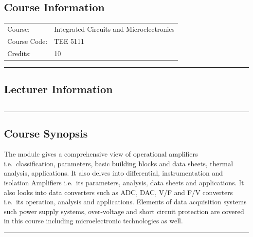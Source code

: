 
\subsection*{Course Information}\label{course:5111}
\vspace{0ex}%
\noindent\parbox{0.5\textwidth}{%
    \noindent\begin{tabular}{@{}ll}
                 \textsf{Course:}          & 	Integrated Circuits and Microelectronics  \\
                 \textsf{Course Code:}         & 	TEE 5111    \\
                 \textsf{Credits:}    & 	10
    \end{tabular}}
\vspace{2ex}\hrule\vspace{2ex}

\subsection*{Lecturer Information}
\noindent\parbox{0.5\textwidth}{%
    \noindent\begin{tabular}{@{}ll}
                 
    \end{tabular}}
\vspace{2ex}\hrule\vspace{2ex}

\subsection*{Course Synopsis}
The module gives a comprehensive view of operational amplifiers i.e.\ classification, parameters, basic building blocks and data sheets, thermal analysis, applications.
It also delves into differential, instrumentation and isolation Amplifiers i.e.\ its parameters, analysis, data sheets and applications.
It also looks into data converters such as ADC, DAC, V/F and F/V converters i.e.\ its operation, analysis and applications.
Elements of data acquisition systems such power supply systems, over-voltage and short circuit protection are covered in this course including microelectronic technologies as well.
\vspace{2ex} \hrule\vspace{2ex}

